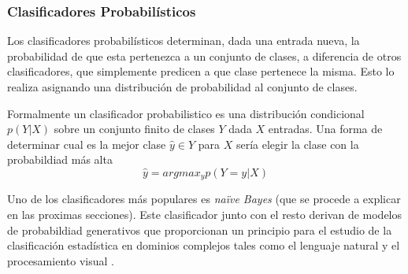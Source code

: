 \subsubsection{Clasificadores Probabilísticos}

		Los clasificadores probabilísticos determinan, dada una entrada nueva, la probabilidad de que esta pertenezca a un conjunto de clases, a diferencia de otros clasificadores, que simplemente predicen a que clase pertenece la misma. Esto lo realiza asignando una distribución de probabilidad al conjunto de clases.
	
	Formalmente un clasificador probabilistico es una distribución condicional $p(Y|X)$ sobre un conjunto finito de clases $Y$ dada $X$ entradas. Una forma de determinar cual es la mejor clase $\hat{y} \in Y$ para $X$ sería elegir la clase con la probabildiad más alta
	$$\hat{y} = argmax_{y}p(Y=y|X) $$
	
	Uno de los clasificadores más populares es \textit{na\"{i}ve Bayes} (que se procede a explicar en las proximas secciones). Este clasificador junto con el resto derivan de modelos de probabildiad generativos que proporcionan un principio para el estudio de la clasificación estadística en dominios complejos tales como el lenguaje natural y el procesamiento visual \cite{GargRo01}.

